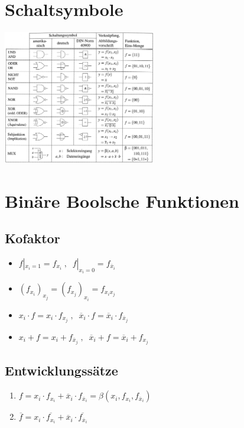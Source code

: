 \documentclass[a4paper,twocolumn,10pt]{article}
\begin{document}
\section*{Schaltsymbole}
\includegraphics[width=0.5\textwidth]{Grafiken/Schaltsymbole}

\section*{Binäre Boolsche Funktionen}
\subsection*{Kofaktor}
	\begin{itemize}[label=-]
	\item $f|_{x_i=1}=f_{x_i}\;,\;\; f|_{x_i=0}=f_{\overline{x}_i}$
	\item $(f_{x_i})_{x_j}=(f_{x_j})_{x_i}=f_{x_ix_j}$
	\item $x_i\cdot f=x_i\cdot f_{x_j}\;,\;\; \overline{x}_i\cdot f=\overline{x}_i\cdot f_{\overline{x}_j}$
	\item $x_i + f=x_i + f_{\overline{x}_j}\;,\;\; \overline{x}_i+f=\overline{x}_i+f_{x_j}$
\end{itemize}

\subsection*{Entwicklungssätze}
\begin{enumerate}[label=-]
	\item $f=x_i\cdot f_{x_i}+\overline{x}_i\cdot f_{\overline{x}_i}=\beta(x_i, f_{x_i}, f_{\overline{x}_i})$
	\item $\overline{f}=x_i\cdot \overline{f_{x_i}}+\overline{x}_i\cdot \overline{f_{\overline{x}_i}}$
\end{enumerate}
\end{document}
